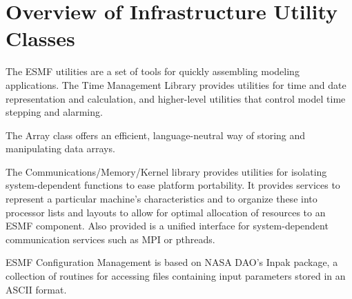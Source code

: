 
\section{Overview of Infrastructure Utility Classes}

The ESMF utilities are
a set of tools for quickly assembling modeling applications.
The Time Management Library
provides utilities for time and date representation and calculation,
and higher-level utilities that control model time stepping and alarming.

The Array class offers an efficient, language-neutral way 
of storing and manipulating data arrays.

The Communications/Memory/Kernel library provides utilities for isolating system-dependent functions to ease
platform portability.  It provides services to represent a particular machine's
characteristics and to organize these into processor lists and layouts to
allow for optimal allocation of resources to an ESMF component. Also provided
is a unified interface for system-dependent communication services such as
MPI or pthreads. 

ESMF Configuration Management is based on NASA DAO's Inpak package, a collection of routines for accessing files containing
input parameters stored in an ASCII format.
